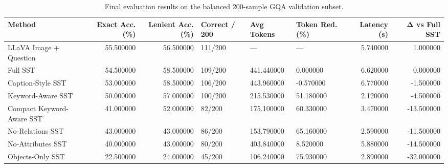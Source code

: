\begin{table}
\caption{Final evaluation results on the balanced 200-sample GQA validation subset.}
\label{tab:final_results}
\begin{tabular}{lrrlllrr}
\toprule
Method & Exact Acc. (\%) & Lenient Acc. (\%) & Correct / 200 & Avg Tokens & Token Red. (\%) & Latency (s) & Δ vs Full SST \\
\midrule
LLaVA Image + Question & 55.500000 & 56.500000 & 111/200 & — & — & 5.740000 & 1.000000 \\
Full SST & 54.500000 & 58.500000 & 109/200 & 441.440000 & 0.000000 & 6.620000 & 0.000000 \\
Caption-Style SST & 53.000000 & 58.500000 & 106/200 & 443.960000 & -0.570000 & 6.770000 & -1.500000 \\
Keyword-Aware SST & 50.000000 & 57.000000 & 100/200 & 215.530000 & 51.180000 & 2.120000 & -4.500000 \\
Compact Keyword-Aware SST & 41.000000 & 52.000000 & 82/200 & 175.100000 & 60.330000 & 3.470000 & -13.500000 \\
No-Relations SST & 43.000000 & 43.000000 & 86/200 & 153.790000 & 65.160000 & 2.590000 & -11.500000 \\
No-Attributes SST & 40.000000 & 43.000000 & 80/200 & 403.840000 & 8.520000 & 5.880000 & -14.500000 \\
Objects-Only SST & 22.500000 & 24.000000 & 45/200 & 106.240000 & 75.930000 & 2.890000 & -32.000000 \\
\bottomrule
\end{tabular}
\end{table}
